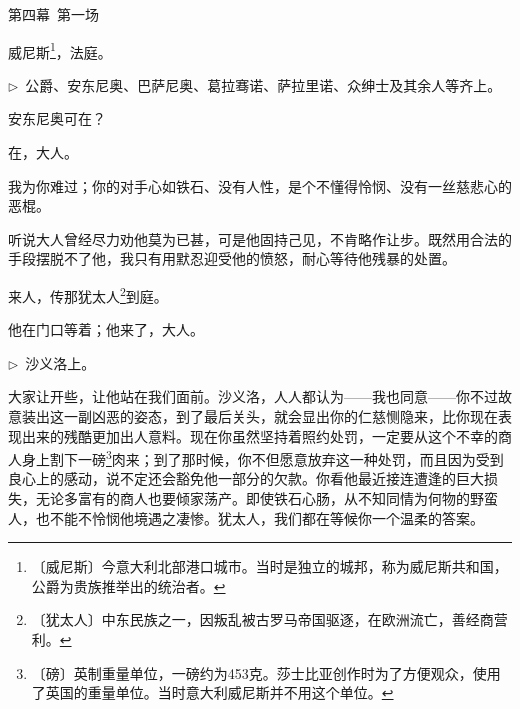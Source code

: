 \documentclass[12pt,UTF-8,openany]{ctexbook}
\begin{document}
\begin{large}
    
    第四幕~第一场
    
    威尼斯\footnote{〔威尼斯〕今意大利北部港口城市。当时是独立的城邦，称为威尼斯共和国，公爵为贵族推举出的统治者。}，法庭。
    
    \noindent $\triangleright$~公爵、安东尼奥、巴萨尼奥、葛拉骞诺、萨拉里诺、众绅士及其余人等齐上。
    
    \begin{description}[itemsep=1ex,leftmargin=4.5em,labelwidth=4em]
    
    \item[{\color{script-1-0} 公爵}]安东尼奥可在？
    
    \item[{\color{script-1-1} 安东尼奥}]在，大人。
    
    \item[{\color{script-1-0} 公爵}]我为你难过；你的对手心如铁石、没有人性，是个不懂得怜悯、没有一丝慈悲心的恶棍。
    
    \item[{\color{script-1-1} 安东尼奥}]听说大人曾经尽力劝他莫为已甚，可是他固持己见，不肯略作让步。既然用合法的手段摆脱不了他，我只有用默忍迎受他的愤怒，耐心等待他残暴的处置。
    
    \item[{\color{script-1-0} 公爵}]来人，传那犹太人\footnote{〔犹太人〕中东民族之一，因叛乱被古罗马帝国驱逐，在欧洲流亡，善经商营利。}到庭。
    
    \item[{\color{script-1-2} 萨拉里诺}]他在门口等着；他来了，大人。
    
    \end{description}
    
    \noindent $\triangleright$~沙义洛上。
    
    \begin{description}[itemsep=1ex,leftmargin=4.5em,labelwidth=4em]
    
    \item[{\color{script-1-0} 公爵}]大家让开些，让他站在我们面前。沙义洛，人人都认为——我也同意——你不过故意装出这一副凶恶的姿态，到了最后关头，就会显出你的仁慈恻隐来，比你现在表现出来的残酷更加出人意料。现在你虽然坚持着照约处罚，一定要从这个不幸的商人身上割下一磅\footnote{〔磅〕英制重量单位，一磅约为453克。莎士比亚创作时为了方便观众，使用了英国的重量单位。当时意大利威尼斯并不用这个单位。}肉来；到了那时候，你不但愿意放弃这一种处罚，而且因为受到良心上的感动，说不定还会豁免他一部分的欠款。你看他最近接连遭逢的巨大损失，无论多富有的商人也要倾家荡产。即使铁石心肠，从不知同情为何物的野蛮人，也不能不怜悯他境遇之凄惨。犹太人，我们都在等候你一个温柔的答案。
    

\end{description}
\end{large}
\end{document}
